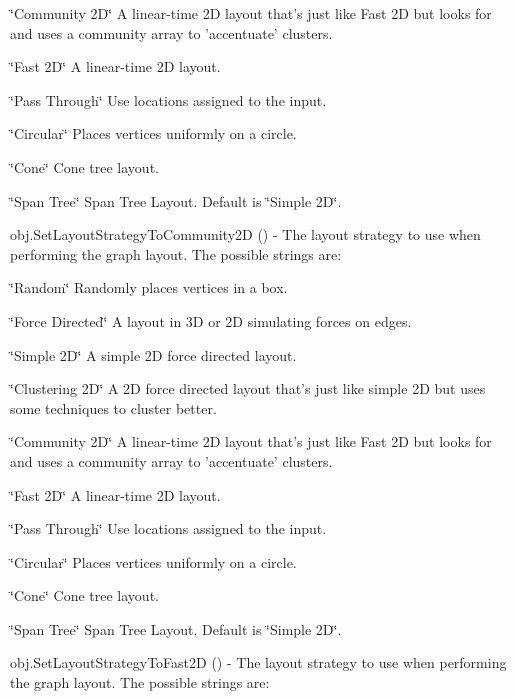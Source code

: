 \begin{DoxyItemize}
\begin{DoxyItemize}
\item \char`\"{}\-Community 2\-D\char`\"{} A linear-\/time 2\-D layout that's just like Fast 2\-D but looks for and uses a community array to 'accentuate' clusters.
\item \char`\"{}\-Fast 2\-D\char`\"{} A linear-\/time 2\-D layout.
\item \char`\"{}\-Pass Through\char`\"{} Use locations assigned to the input.
\item \char`\"{}\-Circular\char`\"{} Places vertices uniformly on a circle.
\item \char`\"{}\-Cone\char`\"{} Cone tree layout.
\item \char`\"{}\-Span Tree\char`\"{} Span Tree Layout. Default is \char`\"{}\-Simple 2\-D\char`\"{}.  
\end{DoxyItemize}
\item {\ttfamily obj.\-Set\-Layout\-Strategy\-To\-Community2\-D ()} -\/ The layout strategy to use when performing the graph layout. The possible strings are\-:
\begin{DoxyItemize}
\item \char`\"{}\-Random\char`\"{} Randomly places vertices in a box.
\item \char`\"{}\-Force Directed\char`\"{} A layout in 3\-D or 2\-D simulating forces on edges.
\item \char`\"{}\-Simple 2\-D\char`\"{} A simple 2\-D force directed layout.
\item \char`\"{}\-Clustering 2\-D\char`\"{} A 2\-D force directed layout that's just like simple 2\-D but uses some techniques to cluster better.
\item \char`\"{}\-Community 2\-D\char`\"{} A linear-\/time 2\-D layout that's just like Fast 2\-D but looks for and uses a community array to 'accentuate' clusters.
\item \char`\"{}\-Fast 2\-D\char`\"{} A linear-\/time 2\-D layout.
\item \char`\"{}\-Pass Through\char`\"{} Use locations assigned to the input.
\item \char`\"{}\-Circular\char`\"{} Places vertices uniformly on a circle.
\item \char`\"{}\-Cone\char`\"{} Cone tree layout.
\item \char`\"{}\-Span Tree\char`\"{} Span Tree Layout. Default is \char`\"{}\-Simple 2\-D\char`\"{}.  
\end{DoxyItemize}
\item {\ttfamily obj.\-Set\-Layout\-Strategy\-To\-Fast2\-D ()} -\/ The layout strategy to use when performing the graph layout. The possible strings are\-:

\end{DoxyItemize}
